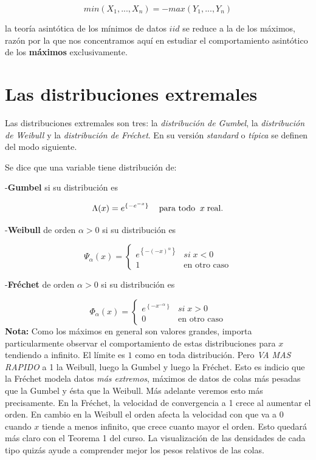 \documentclass[
  20pt,
]{book}
\theoremstyle{definition}
\theoremstyle{definition}
\theoremstyle{definition}
\theoremstyle{definition}
\theoremstyle{remark}
\begin{document}
\begin{equation}
min(X_1,...,X_n) = - max(Y_1,...,Y_n)
\end{equation}

la teoría asintótica de los mínimos de datos \(iid\)
se reduce a la de los máximos, razón por la que
nos concentramos aquí en estudiar el
comportamiento asintótico de los \textbf{máximos}
exclusivamente.

\section{Las distribuciones extremales}\label{las-distribuciones-extremales}

Las distribuciones extremales son tres: la
\emph{distribución de Gumbel}, la \emph{distribución de Weibull} y
la \emph{distribución de Fréchet}. En su versión \emph{standard} o \emph{típica} se definen del modo
siguiente.

Se dice que una variable tiene distribución de:

-\textbf{Gumbel} si su distribución es

\[\Lambda(x) = e^{\{-e^{-x}\}}\hspace{0.3cm}\text{ para todo }\: x \;\text{real}.\]

-\textbf{Weibull} de orden \(\alpha>0\) si su distribución es

\[\Psi_{\alpha}(x)=\begin{cases}
e^{\left\{-(-x)^{\alpha}  \right\}} & si\;x<0\\
1 & \text{en otro caso}
\end{cases}\]

-\textbf{Fréchet} de orden \(\alpha>0\) si su distribución es

\[
\Phi_{\alpha}(x)=\begin{cases}
e^{\left\{ -x^{-\alpha}\right\}} & si\;x>0\\
0 & \text{en otro caso}
\end{cases}
\]
\textbf{Nota:} Como los máximos en general son valores grandes,
importa particularmente observar el comportamiento de estas distribuciones para \(x\) tendiendo a infinito. El límite es \(1\) como en toda distribución. Pero \emph{VA MAS RAPIDO} a 1 la Weibull, luego la Gumbel y luego la Fréchet. Esto es indicio que la
Fréchet modela datos \emph{más extremos}, máximos de datos de
colas más pesadas que la Gumbel y ésta que la Weibull. Más
adelante veremos esto más precisamente. En la Fréchet, la
velocidad de convergencia a 1 crece al aumentar el orden. En cambio en la Weibull el orden afecta la velocidad con que va a 0 cuando \(x\) tiende a menos infinito, que crece cuanto mayor el orden. Esto quedará más claro con el Teorema 1 del curso. La visualización de las densidades de cada tipo quizás ayude a comprender mejor los pesos relativos de las colas.
\end{document}
